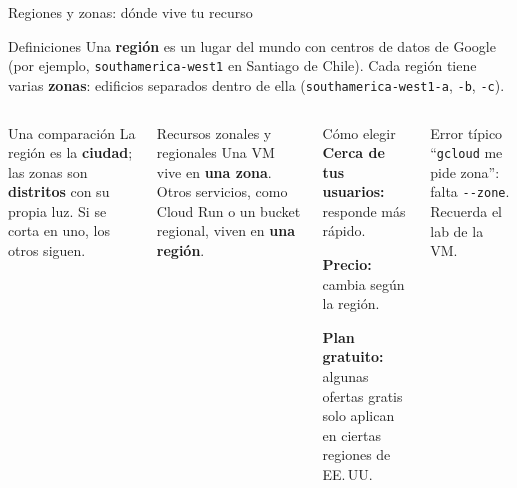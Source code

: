 \documentclass[aspectratio=169,10pt,c]{beamer}
\begin{document}
\begin{frame}{Regiones y zonas: dónde vive tu recurso}
\begin{block}{Definiciones}
\small Una \textbf{región} es un lugar del mundo con centros de datos de Google (por ejemplo, \texttt{southamerica-west1} en Santiago de Chile). Cada región tiene varias \textbf{zonas}: edificios separados dentro de ella (\texttt{southamerica-west1-a}, \texttt{-b}, \texttt{-c}).
\end{block}
\begin{columns}[T,onlytextwidth]
\begin{exampleblock}{Una comparación}
\small La región es la \textbf{ciudad}; las zonas son \textbf{distritos} con su propia luz. Si se corta en uno, los otros siguen.
\end{exampleblock}
\begin{block}{Recursos zonales y regionales}
\small Una VM vive en \textbf{una zona}. Otros servicios, como Cloud Run o un bucket regional, viven en \textbf{una región}.
\end{block}
\begin{block}{Cómo elegir}
\small
\textbf{Cerca de tus usuarios:} responde más rápido.\par\smallskip
\textbf{Precio:} cambia según la región.\par\smallskip
\textbf{Plan gratuito:} algunas ofertas gratis solo aplican en ciertas regiones de EE.\,UU.
\end{block}
\begin{alertblock}{Error típico}
\small ``\texttt{gcloud} me pide zona'': falta \texttt{-{}-zone}. Recuerda el lab de la VM.
\end{alertblock}
\end{columns}
\end{frame}
\end{document}
